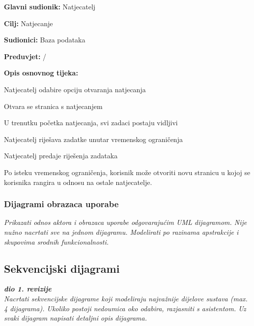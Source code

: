 				\noindent {}
			\begin{packed_item}
				
				\item \textbf{Glavni sudionik: } Natjecatelj
				\item  \textbf{Cilj:} Natjecanje
				\item  \textbf{Sudionici:} Baza podataka
				\item  \textbf{Preduvjet:}  / 
				\item  \textbf{Opis osnovnog tijeka:}
				
				\item[] \begin{packed_enum}
					\item Natjecatelj odabire opciju otvaranja natjecanja
					\item Otvara se stranica s natjecanjem
					\item U trenutku početka natjecanja, svi zadaci postaju vidljivi
					\item Natjecatelj riješava zadatke unutar vremenskog ograničenja
					\item Natjecatelj predaje riješenja zadataka
					\item Po isteku vremenskog ograničenja, korisnik može otvoriti novu stranicu u kojoj se korisnika rangira u odnosu na ostale natjecatelje.
				\end{packed_enum}
			\end{packed_item}
				
					
				\subsubsection{Dijagrami obrazaca uporabe}
					
					\textit{Prikazati odnos aktora i obrazaca uporabe odgovarajućim UML dijagramom. Nije nužno nacrtati sve na jednom dijagramu. Modelirati po razinama apstrakcije i skupovima srodnih funkcionalnosti.}
				\eject		
				
			\subsection{Sekvencijski dijagrami}
				
				\textbf{\textit{dio 1. revizije}}\\
				
				\textit{Nacrtati sekvencijske dijagrame koji modeliraju najvažnije dijelove sustava (max. 4 dijagrama). Ukoliko postoji nedoumica oko odabira, razjasniti s asistentom. Uz svaki dijagram napisati detaljni opis dijagrama.}
				\eject
	
